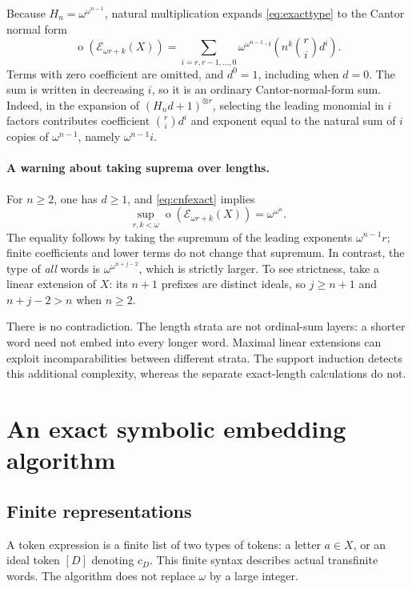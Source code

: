 \documentclass[11pt]{article}
\numberwithin{equation}{section}
\theoremstyle{plain}
\theoremstyle{definition}
\theoremstyle{remark}
\newcommand{\ot}{\operatorname{o}}
\newcommand{\E}{\mathcal E}
\newcommand{\HH}{H}
\begin{document}
Because $\HH_n=\omega^{\omega^{n-1}}$, natural multiplication expands \eqref{eq:exacttype} to the Cantor normal form
\begin{equation}\label{eq:cnfexact}
 \ot(\E_{\omega r+k}(X))
  =\sum_{i=r,r-1,\ldots,0}
    \omega^{\omega^{n-1}\cdot i}
       \left(n^k\binom ri d^i\right).
\end{equation}
Terms with zero coefficient are omitted, and $d^0=1$, including when $d=0$. The sum is written in decreasing $i$, so it is an ordinary Cantor-normal-form sum. Indeed, in the expansion of $(\HH_n d+1)^{\otimes r}$, selecting the leading monomial in $i$ factors contributes coefficient $\binom ri d^i$ and exponent equal to the natural sum of $i$ copies of $\omega^{n-1}$, namely $\omega^{n-1}i$.

\paragraph{A warning about taking suprema over lengths.}
For $n\geq2$, one has $d\geq1$, and \eqref{eq:cnfexact} implies
\begin{equation}\label{eq:stratumsup}
 \sup_{r,k<\omega}\ot(\E_{\omega r+k}(X))
   =\omega^{\omega^n}.
\end{equation}
The equality follows by taking the supremum of the leading exponents $\omega^{n-1}r$; finite coefficients and lower terms do not change that supremum. In contrast, the type of \emph{all} words is $\omega^{\omega^{n+j-2}}$, which is strictly larger. To see strictness, take a linear extension of $X$: its $n+1$ prefixes are distinct ideals, so $j\geq n+1$ and $n+j-2>n$ when $n\geq2$.

There is no contradiction. The length strata are not ordinal-sum layers: a shorter word need not embed into every longer word. Maximal linear extensions can exploit incomparabilities between different strata. The support induction detects this additional complexity, whereas the separate exact-length calculations do not.

\section{An exact symbolic embedding algorithm}\label{sec:algorithm}

\subsection{Finite representations}

A token expression is a finite list of two types of tokens: a letter $a\in X$, or an ideal token $[D]$ denoting $c_D$. This finite syntax describes actual transfinite words. The algorithm does not replace $\omega$ by a large integer.
\end{document}
